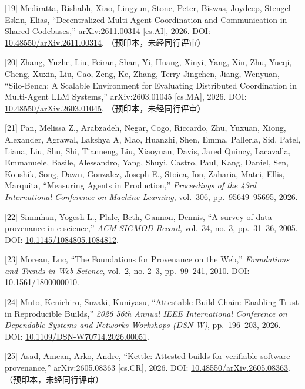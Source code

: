 \documentclass[
]{article}
\begin{document}
{[}19{]} Mediratta, Rishabh, Xiao, Lingyun, Stone, Peter, Biswas,
Joydeep, Stengel-Eskin, Elias, ``Decentralized Multi-Agent Coordination
and Communication in Shared Codebases,'' arXiv:2611.00314 {[}cs.AI{]},
2026. DOI:
\href{https://doi.org/10.48550/arXiv.2611.00314}{10.48550/arXiv.2611.00314}.
（预印本，未经同行评审）

{[}20{]} Zhang, Yuzhe, Liu, Feiran, Shan, Yi, Huang, Xinyi, Yang, Xin,
Zhu, Yueqi, Cheng, Xuxin, Liu, Cao, Zeng, Ke, Zhang, Terry Jingchen,
Jiang, Wenyuan, ``Silo-Bench: A Scalable Environment for Evaluating
Distributed Coordination in Multi-Agent LLM Systems,'' arXiv:2603.01045
{[}cs.MA{]}, 2026. DOI:
\href{https://doi.org/10.48550/arXiv.2603.01045}{10.48550/arXiv.2603.01045}.
（预印本，未经同行评审）

{[}21{]} Pan, Melissa Z., Arabzadeh, Negar, Cogo, Riccardo, Zhu, Yuxuan,
Xiong, Alexander, Agrawal, Lakshya A, Mao, Huanzhi, Shen, Emma,
Pallerla, Sid, Patel, Liana, Liu, Shu, Shi, Tianneng, Liu, Xiaoyuan,
Davis, Jared Quincy, Lacavalla, Emmanuele, Basile, Alessandro, Yang,
Shuyi, Castro, Paul, Kang, Daniel, Sen, Koushik, Song, Dawn, Gonzalez,
Joseph E., Stoica, Ion, Zaharia, Matei, Ellis, Marquita, ``Measuring
Agents in Production,'' \emph{Proceedings of the 43rd International
Conference on Machine Learning}, vol.~306, pp.~95649--95695, 2026.

{[}22{]} Simmhan, Yogesh L., Plale, Beth, Gannon, Dennis, ``A survey of
data provenance in e-science,'' \emph{ACM SIGMOD Record}, vol.~34, no.
3, pp.~31--36, 2005. DOI:
\href{https://doi.org/10.1145/1084805.1084812}{10.1145/1084805.1084812}.

{[}23{]} Moreau, Luc, ``The Foundations for Provenance on the Web,''
\emph{Foundations and Trends in Web Science}, vol.~2, no. 2--3,
pp.~99--241, 2010. DOI:
\href{https://doi.org/10.1561/1800000010}{10.1561/1800000010}.

{[}24{]} Muto, Kenichiro, Suzaki, Kuniyasu, ``Attestable Build Chain:
Enabling Trust in Reproducible Builds,'' \emph{2026 56th Annual IEEE
International Conference on Dependable Systems and Networks Workshops
(DSN-W)}, pp.~196--203, 2026. DOI:
\href{https://doi.org/10.1109/DSN-W70714.2026.00051}{10.1109/DSN-W70714.2026.00051}.

{[}25{]} Asad, Amean, Arko, Andr\textquotesingle e, ``Kettle: Attested
builds for verifiable software provenance,'' arXiv:2605.08363
{[}cs.CR{]}, 2026. DOI:
\href{https://doi.org/10.48550/arXiv.2605.08363}{10.48550/arXiv.2605.08363}.
（预印本，未经同行评审）
\end{document}
